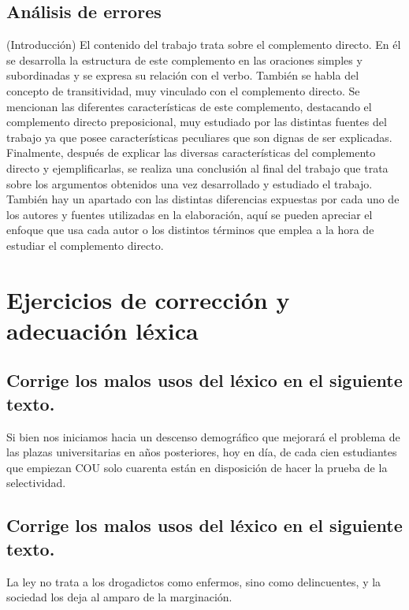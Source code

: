 \documentclass[12pt, a4paper, oneside]{report}
\begin{document}
\section{Análisis de errores}
 (Introducción)
El contenido del trabajo trata sobre el complemento directo. %
En él se desarrolla la estructura de este complemento en las
oraciones simples y subordinadas y se expresa su relación con el
verbo.
También se habla del concepto de transitividad, muy vinculado
con el complemento directo.
Se
mencionan
las
diferentes
características
de
este
complemento, destacando el complemento directo preposicional,
muy estudiado por las distintas fuentes del trabajo ya que posee
características peculiares que son dignas de ser explicadas.
Finalmente, después de explicar las diversas características del
complemento directo y ejempliﬁcarlas, se realiza una conclusión
al ﬁnal del trabajo que trata sobre los argumentos obtenidos una
vez desarrollado y estudiado el trabajo. También hay un apartado
con las distintas diferencias expuestas por cada uno de los autores
y fuentes utilizadas en la elaboración, aquí se pueden apreciar el
enfoque que usa cada autor o los distintos términos que emplea a
la hora de estudiar el complemento directo.
\clearpage


\chapter*{Ejercicios de corrección y adecuación léxica}
\setcounter{chapter}{2}
\setcounter{section}{0}

\section{Corrige los malos usos
  del léxico en el siguiente texto.}
Si bien nos iniciamos hacia un descenso %
demográﬁco que mejorará el problema de
las
plazas
universitarias
en
años
posteriores, hoy en día, de cada cien
estudiantes que empiezan COU solo
cuarenta están en disposición de hacer la
prueba de la selectividad.

\section{Corrige los malos usos
  del léxico en el siguiente texto.}
La ley no trata a los drogadictos como
enfermos, sino como delincuentes, y la
sociedad los deja al amparo de la
marginación.
\end{document}
